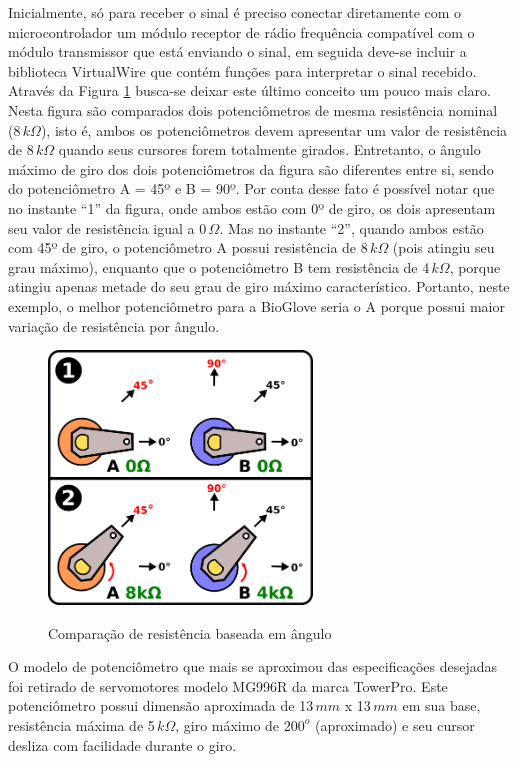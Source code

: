 \documentclass[
	12pt,				%
	openright,			%
	oneside,			%
	a4paper,			%
	english,			%
	brazil				%
	]{abntex2}
\begin{document}
		Inicialmente, só para receber o sinal é preciso conectar diretamente com o microcontrolador um módulo receptor de rádio frequência compatível com o módulo transmissor que está enviando o sinal, em seguida deve-se incluir a biblioteca VirtualWire que contém funções para interpretar o sinal recebido. 
			Através da Figura \ref{Fig:pot-comparison} busca-se deixar este último conceito um pouco mais claro. Nesta figura são comparados dois potenciômetros de mesma resistência nominal (8$\,k\Omega$), isto é, ambos os potenciômetros devem apresentar um valor de resistência de 8$\,k\Omega$ quando seus cursores forem totalmente girados. Entretanto, o ângulo máximo de giro dos dois potenciômetros da figura são diferentes entre si, sendo do potenciômetro A = 45º e B = 90º. Por conta desse fato é possível notar que no instante ``1'' da figura, onde ambos estão com 0º de giro, os dois apresentam seu valor de resistência igual a 0$\,\Omega$. Mas no instante ``2'', quando ambos estão com 45º de giro, o potenciômetro A possui resistência de 8$\,k\Omega$ (pois atingiu seu grau máximo), enquanto que o potenciômetro B tem resistência de 4$\,k\Omega$, porque atingiu apenas metade do seu grau de giro máximo característico. Portanto, neste exemplo, o melhor potenciômetro para a BioGlove seria o A porque possui maior variação de resistência por ângulo.

		\begin{figure}[h!]
			\centering
			\caption{Comparação de resistência baseada em ângulo}
  		\includegraphics[width=7cm]{./figures/pot-comparison.png}
  		\label{Fig:pot-comparison}
		\end{figure}
			
			O modelo de potenciômetro que mais se aproximou das especificações desejadas foi retirado de servomotores modelo MG996R da marca TowerPro. Este potenciômetro possui dimensão aproximada de 13$\,mm$ x 13$\,mm$ em sua base, resistência máxima de 5$\,k\Omega$, giro máximo de $200^{o}$ (aproximado) e seu cursor desliza com facilidade durante o giro. 
\end{document}
